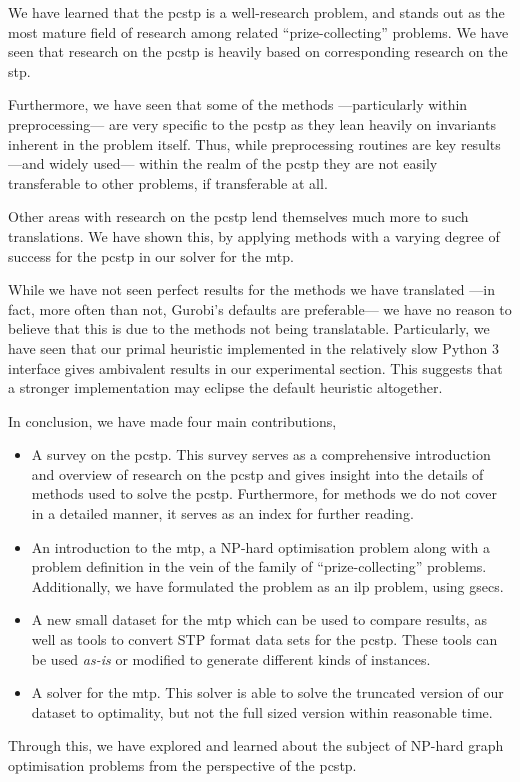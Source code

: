 We have learned that the \gls{pcstp}
is a well-research problem, and stands out as the most mature field of
research among related ``prize-collecting'' problems.
We have seen that research on the \gls{pcstp} is heavily based on corresponding
research on the \gls{stp}.

Furthermore, we have seen that some of the methods
---particularly within preprocessing---
are very specific to the \gls{pcstp} as they lean heavily on
invariants inherent in the problem itself. Thus, while preprocessing routines
are key results ---and widely used--- within the realm of the \gls{pcstp}
they are not easily transferable to other problems, if transferable at all.

Other areas with research on the \gls{pcstp} lend themselves much more to such
translations. We have shown this, by applying methods
with a varying degree of success for the
\gls{pcstp} in our solver for the \gls{mtp}.

While we have not seen perfect results for the methods we have translated
---in fact, more often than not, Gurobi's defaults are preferable---
we have no reason to believe that this is due to the methods not being
translatable. Particularly, we have seen that our primal heuristic implemented
in the relatively slow Python 3 interface gives ambivalent results in our experimental
section. This suggests that a stronger implementation may eclipse the default heuristic
altogether.

In conclusion, we have made four main contributions,
\begin{itemize}
\item A survey on the \gls{pcstp}. This survey serves as a comprehensive introduction
  and overview of research on the \gls{pcstp} and gives insight into the details of
  methods used to solve the \gls{pcstp}. Furthermore, for methods we do not cover
  in a detailed manner, it serves as an index for further reading.
\item An introduction to the \acrlong{mtp}, a NP-hard optimisation problem along with
  a problem definition in the vein of the family of ``prize-collecting'' problems.
  Additionally, we have formulated the problem as an \gls{ilp} problem, using \glspl{gsec}.
\item A new small dataset for the \gls{mtp} which can be used to compare results, as well
  as tools to convert STP format data sets for the \gls{pcstp}. These tools can be used
  \textit{as-is} or modified to generate different kinds of instances.
\item A solver for the \gls{mtp}. This solver is able to solve the truncated version of
  our dataset to optimality, but not the full sized version within reasonable time.
\end{itemize}

Through this, we have explored and learned about the subject of
NP-hard graph optimisation problems from
the perspective of the \acrlong{pcstp}.



